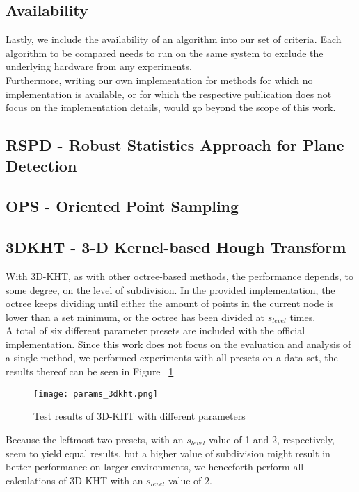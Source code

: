 \documentclass[main.tex]{subfiles}
\begin{document}
\subsection*{Availability}
Lastly, we include the availability of an algorithm into our set of criteria.
Each algorithm to be compared needs to run on the same system to exclude the underlying hardware from any experiments.\\
Furthermore, writing our own implementation for methods for which no implementation is available, or for which the respective publication does not
focus on the implementation details, would go beyond the scope of this work.



\subsection*{RSPD - Robust Statistics Approach for Plane Detection}

\subsection*{OPS - Oriented Point Sampling}
\newpage
\subsection*{3DKHT - 3-D Kernel-based Hough Transform}
With 3D-KHT, as with other octree-based methods, the performance depends, to some degree, on the level of subdivision.
In the provided implementation, the octree keeps dividing until either the amount of points in the current node is lower than a set minimum, or the
octree has been divided at $s_{level}$ times.\\
A total of six different parameter presets are included with the official implementation.
Since this work does not focus on the evaluation and analysis of a single method, we performed experiments with all presets on a data set, the
results thereof can be seen in Figure ~\ref{fig:3dkht_params}

\begin{figure}[!h]
    \centering
    \texttt{[image: params\_3dkht.png]}
    \caption{Test results of 3D-KHT with different parameters}
    \label{fig:3dkht_params}
\end{figure}

Because the leftmost two presets, with an $s_{level}$ value of 1 and 2, respectively, seem to yield equal results, but a higher value of subdivision
might result in better performance on larger environments,
we henceforth perform all calculations of 3D-KHT with an $s_{level}$ value of 2.
\end{document}
